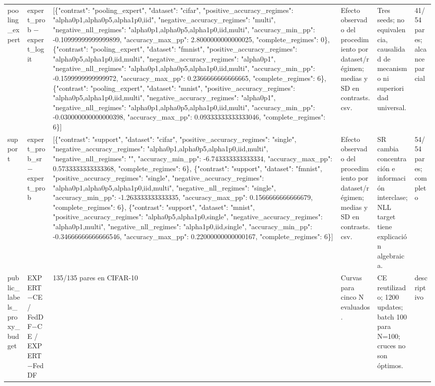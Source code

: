 \begin{tabular}{llllll}
pooling\_expert & expert\_prob − expert\_logit & [\{"contrast": "pooling\_expert", "dataset": "cifar", "positive\_accuracy\_regimes": "alpha0p1,alpha0p5,alpha1p0,iid", "negative\_accuracy\_regimes": "multi", "negative\_nll\_regimes": "alpha0p1,alpha0p5,alpha1p0,iid,multi", "accuracy\_min\_pp": -0.10999999999999899, "accuracy\_max\_pp": 2.8000000000000025, "complete\_regimes": 0\}, \{"contrast": "pooling\_expert", "dataset": "fmnist", "positive\_accuracy\_regimes": "alpha0p5,alpha1p0,iid,multi", "negative\_accuracy\_regimes": "alpha0p1", "negative\_nll\_regimes": "alpha0p1,alpha0p5,alpha1p0,iid,multi", "accuracy\_min\_pp": -0.1599999999999972, "accuracy\_max\_pp": 0.2366666666666665, "complete\_regimes": 6\}, \{"contrast": "pooling\_expert", "dataset": "mnist", "positive\_accuracy\_regimes": "alpha0p5,alpha1p0,iid,multi", "negative\_accuracy\_regimes": "alpha0p1", "negative\_nll\_regimes": "alpha0p1,alpha0p5,alpha1p0,iid,multi", "accuracy\_min\_pp": -0.030000000000000398, "accuracy\_max\_pp": 0.09333333333333046, "complete\_regimes": 6\}] & Efecto observado del procedimiento por dataset/régimen; medias y SD en contrasts.csv. & Tres seeds; no equivalencia, causalidad de mecanismo ni superioridad universal. & 41/54 pares; alcance parcial \\
support & expert\_prob\_sr − expert\_prob & [\{"contrast": "support", "dataset": "cifar", "positive\_accuracy\_regimes": "single", "negative\_accuracy\_regimes": "alpha0p1,alpha0p5,alpha1p0,iid,multi", "negative\_nll\_regimes": "", "accuracy\_min\_pp": -6.743333333333334, "accuracy\_max\_pp": 0.5733333333333368, "complete\_regimes": 6\}, \{"contrast": "support", "dataset": "fmnist", "positive\_accuracy\_regimes": "single", "negative\_accuracy\_regimes": "alpha0p1,alpha0p5,alpha1p0,iid,multi", "negative\_nll\_regimes": "single", "accuracy\_min\_pp": -1.263333333333335, "accuracy\_max\_pp": 0.1566666666666679, "complete\_regimes": 6\}, \{"contrast": "support", "dataset": "mnist", "positive\_accuracy\_regimes": "alpha0p5,alpha1p0,single", "negative\_accuracy\_regimes": "alpha0p1,multi", "negative\_nll\_regimes": "alpha1p0,iid,single", "accuracy\_min\_pp": -0.34666666666666546, "accuracy\_max\_pp": 0.22000000000000167, "complete\_regimes": 6\}] & Efecto observado del procedimiento por dataset/régimen; medias y SD en contrasts.csv. & SR cambia concentración e información interclase; NLL target tiene explicación algebraica. & 54/54 pares; completo \\
public\_labels\_proxy\_budget & EXPERT−CE / FedDF−CE / EXPERT−FedDF & 135/135 pares en CIFAR-10 & Curvas para cinco N evaluados. & CE reutilizado; 1200 updates; batch 100 para N=100; cruces no son óptimos. & descriptivo \\
\bottomrule
\end{tabular}
